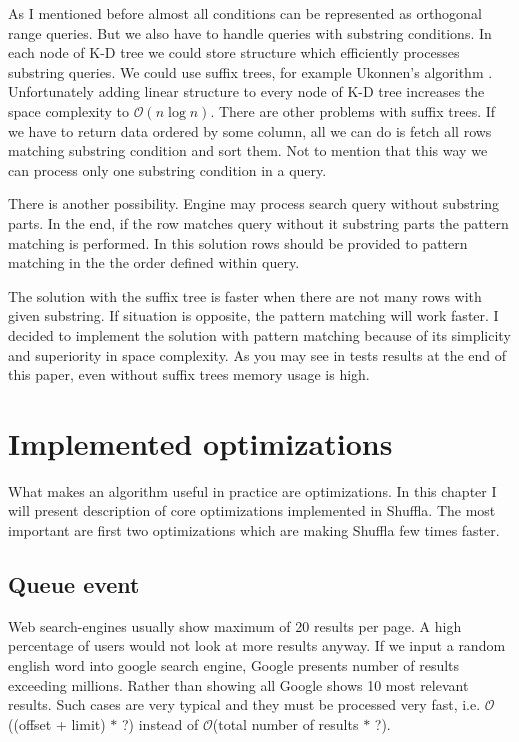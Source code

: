 \documentclass[10pt,a4paper]{article}
\newcommand{\Oh}{\mathcal{O}}
\begin{document}
As I mentioned before almost all conditions can be represented as orthogonal range queries. But we also have to handle queries with substring conditions. In each node of K-D tree we could store structure which efficiently processes substring queries. We could use suffix trees, for example Ukonnen's algorithm \cite{STUKK}. Unfortunately adding linear structure to every node of K-D tree increases the space complexity to $\Oh(n \log n)$. There are other problems with suffix trees. If we have to return data ordered by some column, all we can do is fetch all rows matching substring condition and sort them. Not to mention that this way we can process only one substring condition in a query.

There is another possibility. Engine may process search query without substring parts. In the end, if the row matches query without it substring parts the pattern matching is performed. In this solution rows should be provided to pattern matching in the the order defined within query.

The solution with the suffix tree is faster when there are not many rows with given substring. If situation is opposite, the pattern matching will work faster. I decided to implement the solution with pattern matching because of its simplicity and superiority in space complexity. As you may see in tests results at the end of this paper, even without suffix trees memory usage is high. 

\section{Implemented optimizations}

What makes an algorithm useful in practice are optimizations. In this chapter I will present description of core optimizations implemented in Shuffla. The most important are first two optimizations which are making Shuffla few times faster.

\subsection{Queue event}
Web search-engines usually show maximum of 20 results per page. A high percentage of users would not look at more results anyway. If we input a random english word into google search engine, Google presents number of results exceeding millions. Rather than showing all Google shows 10 most relevant results. Such cases are very typical and they must be processed very fast, i.e. $\Oh$((offset + limit) $*$ ?) instead of $\Oh$(total number of results $*$ ?).
\end{document}
